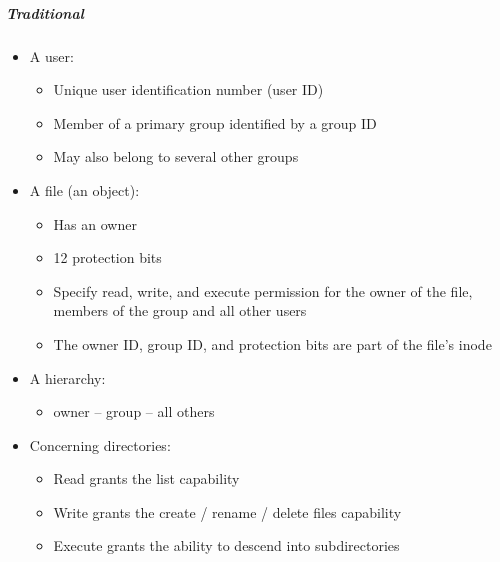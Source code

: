 \documentclass{article}
\begin{document}
                            
                            \subparagraph{Traditional}
                            \begin{itemize}
                                \item A user:
                                \begin{itemize}
                                    \item Unique user identification number (user ID)
                                    \item Member of a primary group identified by a group ID
                                    \item May also belong to several other groups
                                \end{itemize}
                                \item A file (an object):
                                \begin{itemize}
                                    \item Has an owner
                                    \item 12 protection bits
                                    \item Specify read, write, and execute permission for the owner of the file, members of the group and all other users
                                    \item The owner ID, group ID, and protection bits are part of the file’s inode
                                \end{itemize}
                                \item A hierarchy:
                                \begin{itemize}
                                    \item owner – group – all others
                                \end{itemize}
                                \item Concerning directories:
                                \begin{itemize}
                                    \item Read grants the list capability
                                    \item Write grants the create / rename / delete files capability
                                    \item Execute grants the ability to descend into subdirectories
                                \end{itemize}

\end{itemize}
\end{document}
